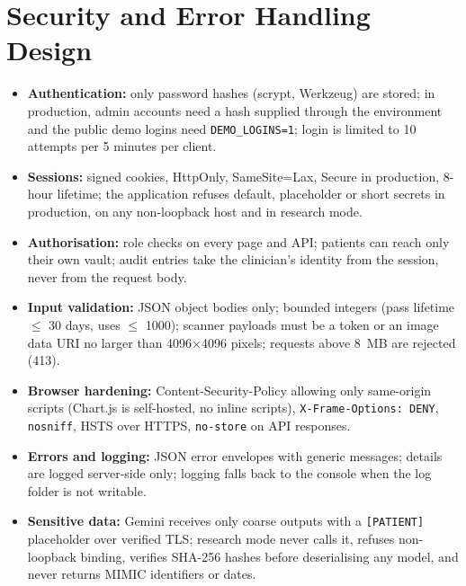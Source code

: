 \section{Security and Error Handling Design}
\label{sec:secdesign}
\begin{itemize}
\item \textbf{Authentication:} only password hashes (scrypt, Werkzeug) are stored; in production, admin
      accounts need a hash supplied through the environment and the public demo logins need
      \texttt{DEMO\_LOGINS=1}; login is limited to 10 attempts per 5 minutes per client.
\item \textbf{Sessions:} signed cookies, HttpOnly, SameSite=Lax, Secure in production, 8-hour lifetime;
      the application refuses default, placeholder or short secrets in production, on any non-loopback
      host and in research mode.
\item \textbf{Authorisation:} role checks on every page and API; patients can reach only their own vault;
      audit entries take the clinician's identity from the session, never from the request body.
\item \textbf{Input validation:} JSON object bodies only; bounded integers (pass lifetime $\le$ 30 days,
      uses $\le$ 1000); scanner payloads must be a token or an image data URI no larger than 4096$\times$4096
      pixels; requests above 8~MB are rejected (413).
\item \textbf{Browser hardening:} Content-Security-Policy allowing only same-origin scripts (Chart.js is
      self-hosted, no inline scripts), \texttt{X-Frame-Options: DENY}, \texttt{nosniff}, HSTS over HTTPS,
      \texttt{no-store} on API responses.
\item \textbf{Errors and logging:} JSON error envelopes with generic messages; details are logged
      server-side only; logging falls back to the console when the log folder is not writable.
\item \textbf{Sensitive data:} Gemini receives only coarse outputs with a \texttt{[PATIENT]}
      placeholder over verified TLS; research mode never calls it, refuses non-loopback binding, verifies
      SHA-256 hashes before deserialising any model, and never returns MIMIC identifiers or dates.
\end{itemize}
